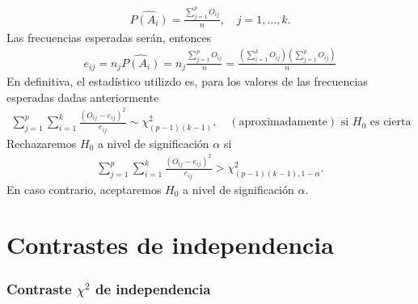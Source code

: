 \begin{align*}
    \widehat{P(A_i)} = \frac{\sum_{j=1}^{p} O_{ij}}{n}, \quad j = 1,\ldots,k.
\end{align*}
Las frecuencias esperadas serán, entonces
\begin{align*}
    e_{ij} = n_j \widehat{P(A_i)} = n_j  \frac{\sum_{j=1}^{p} O_{ij}}{n} = \frac{\left(\sum_{i=1}^{k} O_{ij}\right)\left(\sum_{j=1}^{p} O_{ij}\right)}{n}
\end{align*}
En definitiva, el estadístico utilizdo es, para los valores de las frecuencias esperadas dadas anteriormente
\begin{align*}
    \sum_{j=1}^{p}\sum_{i=1}^{k} \frac{(O_{ij} - e_{ij})^2}{e_{ij}} \sim \chi^2_{(p-1)(k-1)}, \quad (\text{aproximadamente}) \text{ si $H_0$ es cierta}
\end{align*}
Rechazaremos $H_0$ a nivel de significación $\alpha$ si
\begin{align*}
    \sum_{j=1}^{p}\sum_{i=1}^{k} \frac{(O_{ij} - e_{ij})^2}{e_{ij}} > \chi^2_{(p-1)(k-1), 1 - \alpha}.
\end{align*}
En caso contrario, aceptaremos $H_0$ a nivel de significación $\alpha$.

\section{Contrastes de independencia}

\subsubsection{Contraste $\chi^2$ de independencia}

